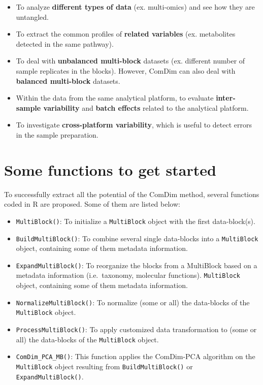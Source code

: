 \documentclass[
]{book}
\providecommand{\tightlist}{%
  \setlength{\itemsep}{0pt}\setlength{\parskip}{0pt}}
\begin{document}
\begin{itemize}
\tightlist
\item
  To analyze \textbf{different types of data} (ex. multi-omics) and see how they are
  untangled.
\item
  To extract the common profiles of \textbf{related variables} (ex. metabolites
  detected in the same pathway).
\item
  To deal with \textbf{unbalanced multi-block} datasets (ex. different number of
  sample replicates in the blocks). However, ComDim can also deal with
  \textbf{balanced multi-block} datasets.
\item
  Within the data from the same analytical platform, to evaluate
  \textbf{inter-sample variability} and \textbf{batch effects} related to the analytical
  platform.
\item
  To investigate \textbf{cross-platform variability}, which is useful to detect
  errors in the sample preparation.
\end{itemize}

\hypertarget{functions}{%
\section{Some functions to get started}\label{functions}}

To successfully extract all the potential of the ComDim method, several
functions coded in R are proposed. Some of them are listed below:

\begin{itemize}
\tightlist
\item
  \texttt{MultiBlock()}: To initialize a \texttt{MultiBlock} object with the first data-block(s).
\item
  \texttt{BuildMultiBlock()}: To combine several single data-blocks into a \texttt{MultiBlock}
  object, containing some of them metadata information.
\item
  \texttt{ExpandMultiBlock()}: To reorganize the blocks from a MultiBlock based on a metadata information (i.e.~taxonomy, molecular functions).
  \texttt{MultiBlock} object, containing some of them metadata information.
\item
  \texttt{NormalizeMultiBlock()}: To normalize (some or all) the data-blocks of the
  \texttt{MultiBlock} object.
\item
  \texttt{ProcessMultiBlock()}: To apply customized data transformation to (some or
  all) the data-blocks of the \texttt{MultiBlock} object.
\item
  \texttt{ComDim\_PCA\_MB()}: This function applies the ComDim-PCA algorithm on the
  \texttt{MultiBlock} object resulting from \texttt{BuildMultiBlock()} or \texttt{ExpandMultiBlock()}.
\end{itemize}
\end{document}
